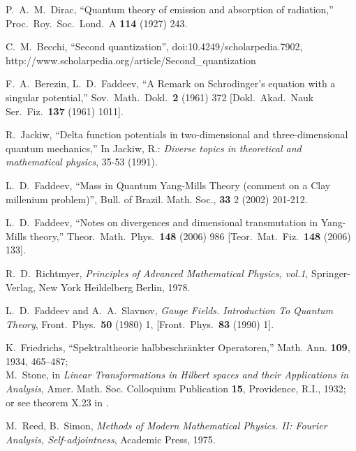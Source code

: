 \documentclass[12pt]{article}
\begin{document}
\begin{thebibliography}{0}

P.~A.~M.~Dirac,
``Quantum theory of emission and absorption of radiation,''
Proc.\ Roy.\ Soc.\ Lond.\ A {\bf 114} (1927) 243.

C.~M.~Becchi,
``Second quantization'', doi:10.4249/scholarpedia.7902,
http://www.scholarpedia.org/article/Second\_quantization

    F.~A.~Berezin, L.~D.~Faddeev,
  ``A Remark on Schrodinger's equation with a singular potential,''
  Sov.\ Math.\ Dokl.\  {\bf 2} (1961) 372
  [Dokl.\ Akad.\ Nauk Ser.\ Fiz.\  {\bf 137} (1961) 1011].

  R.~Jackiw,
  ``Delta function potentials in two-dimensional and three-dimensional
  quantum mechanics,''
  In Jackiw, R.: \emph{Diverse topics in theoretical and mathematical physics},
  35-53 (1991).

L.~D.~Faddeev,
``Mass in Quantum Yang-Mills Theory (comment on a Clay millenium problem)'',
Bull. of Brazil. Math. Soc., {\bf 33} 2 (2002) 201-212.

L.~D.~Faddeev,
``Notes on divergences and dimensional transmutation in Yang-Mills theory,''
Theor.\ Math.\ Phys.\  {\bf 148} (2006) 986
[Teor.\ Mat.\ Fiz.\  {\bf 148} (2006) 133].

    R.~D.~Richtmyer, \emph{Principles of Advanced Mathematical Physics, vol.1},
    Springer-Verlag, New York Heildelberg Berlin, 1978.

  L.~D.~Faddeev and A.~A.~Slavnov,
\emph{Gauge Fields. Introduction To Quantum Theory},
Front.\ Phys.\  {\bf 50} (1980) 1, [Front.\ Phys.\  {\bf 83} (1990) 1].

%
    K.~Friedrichs, ``Spektraltheorie halbbeschr\"ankter Operatoren,''
    Math. Ann. {\bf 109}, 1934, 465--487;\\
    M.~Stone, in \emph{Linear Transformations in Hilbert spaces and their
    Applications in Analysis}, Amer. Math. Soc. Colloquium Publication {\bf 15},
    Providence, R.I., 1932;\\
    or see theorem X.23 in \cite{RS2}.

 M.~Reed, B.~Simon, \emph{Methods of Modern Mathematical Physics.
II: Fourier Analysis, Self-adjointness}, Academic Press, 1975.


\end{thebibliography}
\end{document}
